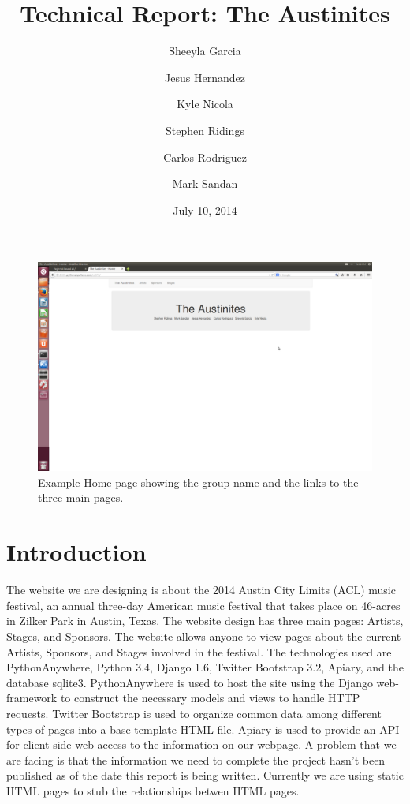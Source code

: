\documentclass[12pt,english]{scrartcl}
\title{Technical Report: The Austinites}
\author{
  Sheeyla Garcia\\
  \and
  Jesus Hernandez\\
  \and
  Kyle Nicola\\
  \and
  Stephen Ridings\\
  \and
  Carlos Rodriguez\\
  \and
  Mark Sandan\\  
}
\date{ July 10, 2014 }
\begin{document}
\thispagestyle{plain}
\maketitle
\tableofcontents

\begin{figure}[h!]
\includegraphics[width=\textwidth]{home}
 \caption{Example Home page showing the group name and the links to the three main pages.}
\end{figure}

\section{Introduction}
The website we are designing is about the 2014 Austin City Limits (ACL) music festival,
 an annual three-day American music festival that takes place on 46-acres in Zilker Park in Austin, Texas. 
The website design has three main pages: Artists, Stages, and Sponsors.
The website allows anyone to view pages about the current Artists, Sponsors, and Stages involved in the festival.
The technologies used are PythonAnywhere, Python 3.4, Django 1.6,
Twitter Bootstrap 3.2, Apiary, and the database sqlite3. PythonAnywhere is used to host the site using the Django web-framework to 
construct the necessary models and views to handle HTTP requests. Twitter Bootstrap is used to organize common data among different
types of pages into a base template HTML file. Apiary is used to provide an API for client-side web access to the information on our webpage.
A problem that we are facing is that the information we need to complete the project hasn't been published as of the date this report
is being written. Currently we are using static HTML pages to stub the relationships betwen HTML pages.
\end{document}
